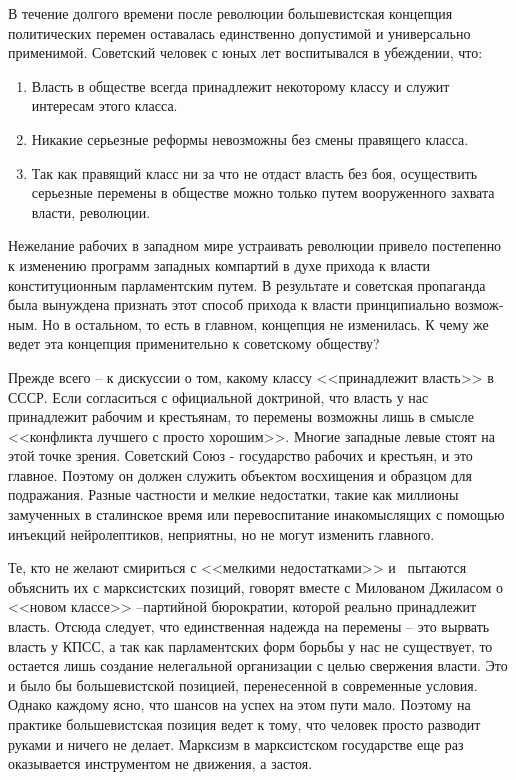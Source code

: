 \documentclass{book}
\begin{document}
В течение долгого времени после революции большевистская концепция политических перемен оставалась единственно допустимой и универсально применимой. Советский человек с юных лет воспитывался в убеждении, что:

\begin{enumerate}
 \item Власть в обществе всегда принадлежит некоторому клас­су и служит интересам этого класса.
 \item Никакие серьезные реформы невозможны без смены правящего класса.
 \item Так как правящий класс ни за что не отдаст власть без боя, осуществить серьезные перемены в обществе можно толь­ко путем вооруженного захвата власти, революции.
\end{enumerate}

Нежелание рабочих в западном мире устраивать революции привело постепенно к изменению программ западных компар­тий в духе прихода к власти конституционным парламентским путем. В результате и советская пропаганда была вынуждена признать этот способ прихода к власти принципиально возмож­ным. Но в остальном, то есть в главном, концепция не измени­лась. К чему же ведет эта концепция применительно к советско­му обществу?

Прежде всего -- к дискуссии о том, какому классу <<принад­лежит власть>> в СССР. Если согласиться с официальной доктри­ной, что власть у нас принадлежит рабочим и крестьянам, то перемены возможны лишь в смысле <<конфликта лучшего с просто хорошим>>. Многие западные левые стоят на этой точке зрения. Советский Союз - государство рабочих и крестьян, и это главное. Поэтому он должен служить объектом восхищения и образцом для подражания. Разные частности и мелкие недо­статки, такие как миллионы замученных в сталинское время или перевоспитание инакомыслящих с помощью инъекций нейролептиков, неприятны, но не могут изменить главного.

Те, кто не желают смириться с <<мелкими недостатками>> и  пытаются объяснить их с марксистских позиций, говорят вместе с Милованом Джиласом о <<новом классе>> --партийной бюрократии, которой реально принадлежит власть. Отсюда следует, что единственная надежда на перемены -- это вырвать власть у КПСС, а так как парламентских форм борьбы у нас не существует, то остается лишь создание нелегальной организации с целью свержения власти. Это и было бы большевистской позицией, перенесенной в современные условия. Однако каждому ясно, что шансов на успех на этом пути мало. Поэтому на практике большевистская позиция ведет к тому, что человек просто разводит руками и ничего не делает. Марксизм в марксистском государстве еще раз оказывается инструментом не движения, а застоя.
\end{document}
